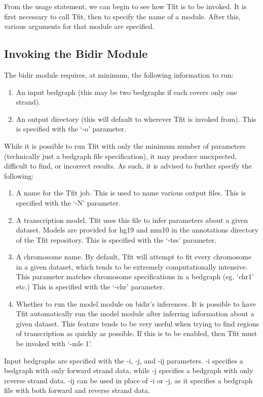 \documentclass[12pt,letterpaper]{article}
\begin{document}
From the usage statement, we can begin to see how Tfit is to be invoked. It is first necessary to call Tfit, then to specify the name of a module. After this, various arguments for that module are specified.

\subsection{Invoking the Bidir Module}
The bidir module requires, at minimum, the following information to run:
\begin{enumerate}
\item An input bedgraph (this may be two bedgraphs if each covers only one strand).
\item An output directory (this will default to wherever Tfit is invoked from). This is specified with the `-o' parameter.
\end{enumerate}

While it is possible to run Tfit with only the minimum number of parameters (technically just a bedgraph file specification), it may produce unexpected, difficult to find, or incorrect results. As such, it is advised to further specify the following:

\begin{enumerate}
\item A name for the Tfit job. This is used to name various output files. This is specified with the `-N' parameter.
\item A transcription model. Tfit uses this file to infer parameters about a given dataset. Models are provided for hg19 and mm10 in the annotations directory of the Tfit repository. This is specified with the `-tss' parameter.
\item A chromosome name. By default, Tfit will attempt to fit every chromosome in a given dataset, which tends to be extremely computationally intensive. This parameter matches chromosome specifications in a bedgraph (eg. `chr1' etc.) This is specified with the `-chr' parameter.
\item Whether to run the model module on bidir's inferences. It is possible to have Tfit automatically run the model module after inferring information about a given dataset. This feature tends to be very useful when trying to find regions of transcription as quickly as possible. If this is to be enabled, then Tfit must be invoked with `-mle 1'.
\end{enumerate}

Input bedgraphs are specified with the -i, -j, and -ij parameters. -i specifies a bedgraph with only forward strand data, while -j specifies a bedgraph with only reverse strand data. -ij can be used in place of -i or -j, as it specifies a bedgraph file with both forward and reverse strand data.
\end{document}
